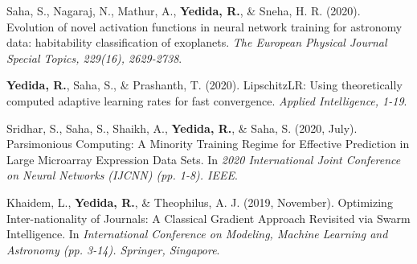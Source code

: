     \item
      {Saha, S., Nagaraj, N., Mathur, A., \textbf{Yedida, R.}, \& Sneha, H. R. (2020). Evolution of novel activation functions in neural network training for astronomy data: habitability classification of exoplanets. \textit{The European Physical Journal Special Topics, 229(16), 2629-2738}.}
    \item
      {\textbf{Yedida, R.}, Saha, S., \& Prashanth, T. (2020). LipschitzLR: Using theoretically computed adaptive learning rates for fast convergence. \textit{Applied Intelligence, 1-19}.}
    \item
      {Sridhar, S., Saha, S., Shaikh, A., \textbf{Yedida, R.}, \& Saha, S. (2020, July). Parsimonious Computing: A Minority Training Regime for Effective Prediction in Large Microarray Expression Data Sets. In \textit{2020 International Joint Conference on Neural Networks (IJCNN) (pp. 1-8). IEEE}.}
    \item
      {Khaidem, L., \textbf{Yedida, R.}, \& Theophilus, A. J. (2019, November). Optimizing Inter-nationality of Journals: A Classical Gradient Approach Revisited via Swarm Intelligence. In \textit{International Conference on Modeling, Machine Learning and Astronomy (pp. 3-14). Springer, Singapore}.}
 \resumeNumberedSubHeadingListEnd